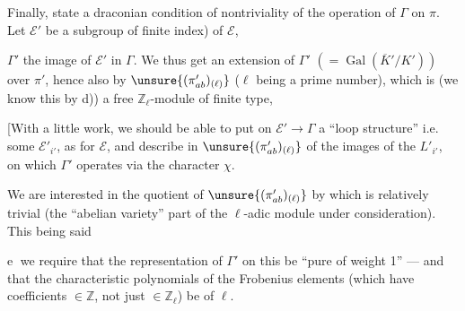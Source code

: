  Finally,  state a draconian condition
of nontriviality of the operation of \(\Gamma\) on \(\pi\).
Let \(\mathcal E'\) be a subgroup 
of finite index) of \(\mathcal E\),



\(\Gamma'\) the image of \(\mathcal E'\) in \(\Gamma\). We thus get an
extension of \(\Gamma'\) \((=\operatorname{Gal}(\overline K'/K'))\) over \(\pi'\),
hence also by \(\unsure{(\pi'_{ab})_{(\ell)}}\)
(\(\ell\) being a prime number), which is (we know this by d)) a
free \(\mathbb Z_\ell\)-module of finite type,

[With a little work, we should be able to put on
\(\mathcal E'\to\Gamma\) a ``loop structure'' i.e. some
\(\mathcal E'_{i'}\), as for \(\mathcal E\), and describe in
\(\unsure{(\pi'_{ab})_{(\ell)}}\)
 of the images of the  \(L'_{i'}\),
on which \(\Gamma'\) operates  via the character \(\chi\).


We are interested in the quotient of \(\unsure{(\pi'_{ab})_{(\ell)}}\) by
 which is relatively trivial (the ``abelian variety'' part of the
\(\ell\)-adic module under consideration). This being said

\textcircled{e} we require that the representation of \(\Gamma'\) on this be
``pure of weight 1'' ---  and that the characteristic polynomials
of the Frobenius elements (which have coefficients \(\in\mathbb Z\), not just
\(\in\mathbb Z_\ell\)) be  of \(\ell\).


